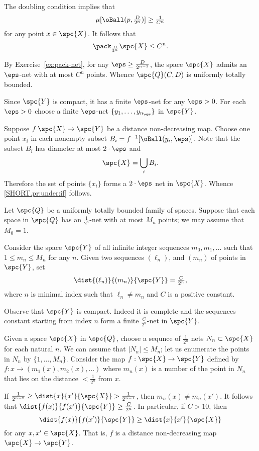 The doubling condition implies that 
\[\mu[\oBall(p,\tfrac D{2^n})]\ge\tfrac 1{C^n}\]
for any point $x\in \spc{X}$.
It follows that 
\[\pack_{\frac D{2^n}}\spc{X}\le C^n.\]

By Exercise~\ref{ex:pack-net}, for any $\eps\ge\frac D{2^{n-1}}$, the space $\spc{X}$ admits an $\eps$-net with at most $C^n$ points.
Whence $\spc{Q}(C,D)$ is uniformly totally bounded.

Since $\spc{Y}$ is compact, it has a finite $\eps$-net for any $\eps>0$.
For each $\eps>0$ choose a finite $\eps$-net $\{y_1,\dots,y_{n_\eps}\}$ in $\spc{Y}$.

Suppose $f\:\spc{X}\to \spc{Y}$ be a distance non-decreasing map.
Choose one point $x_i$ in each nonempty subset $B_i=f^{-1}[\oBall(y_i,\eps)]$.
Note that the subset $B_i$ has diameter at most $2\cdot \eps$ and 
\[\spc{X}=\bigcup_iB_i.\]
Therefore the set of points $\{x_i\}$ forms a $2\cdot\eps$ net in $\spc{X}$.
Whence \ref{SHORT.pr:under:if} follows.

 Let $\spc{Q}$ be a uniformly totally bounded family of spaces. 
Suppose that each space in $\spc{Q}$ has an $\tfrac1{2^n}$-net with at most $M_n$ points; we may assume that $M_0=1$.

Consider the space $\spc{Y}$ of all infinite integer sequences $m_0,m_1,\dots$ such that $1\le m_n\le M_n$ for any $n$.
Given two sequences $(\ell_n)$, and $(m_n)$ of points in $\spc{Y}$, set 
\[\dist{(\ell_n)}{(m_n)}{\spc{Y}}=\tfrac C{2^{n}},\]
where $n$ is minimal index such that $\ell_n\ne m_n$ and $C$ is a positive constant.

Observe that $\spc{Y}$ is compact.
Indeed it is complete and the sequences constant starting from index $n$ form a finite $\tfrac C{2^{n}}$-net in $\spc{Y}$.

Given a space $\spc{X}$ in $\spc{Q}$,
choose a sequnce of $\tfrac1{2^n}$ nets 
$N_n\subset\spc{X}$ for each natural $n$.
We can assume that $|N_n|\le M_n$; let us enumerate the points in $N_n$ by $\{1,\dots,M_n\}$.
Consider the map $f:\spc{X}\to\spc{Y}$ defined by $f:x\to (m_1(x),m_2(x),\dots)$ where $m_n(x)$ is a number of the point in $N_n$ that lies on the distance $<\tfrac1{2^n}$ from $x$.

If $\tfrac1{2^{n-2}}\ge \dist{x}{x'}{\spc{X}}>\tfrac1{2^{n-1}}$, then $m_n(x)\ne m_n(x')$.
It follows that $\dist{f(x)}{f(x')}{\spc{Y}}\ge \tfrac C{2^{n}}$.
In particular, if $C>10$, then 
\[\dist{f(x)}{f(x')}{\spc{Y}}\ge \dist{x}{x'}{\spc{X}}\]
for any $x,x'\in \spc{X}$.
That is, $f$ is a distance non-decreasing map $\spc{X}\to \spc{Y}$.

